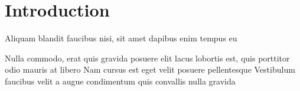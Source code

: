 \documentclass[
paper=landscape,
paper=160mm:90mm, %
fontsize=11pt, %
pagesize, %
parskip=half-, %
]{scrartcl} %
\theoremstyle{mythmstyle} %
\begin{document}
\clearpage




\section{Introduction}


\begin{outline}

\1 Aliquam blandit faucibus nisi, sit amet dapibus enim tempus eu

\2 Nulla commodo, erat quis gravida posuere
\1 elit lacus lobortis est, quis porttitor odio mauris at libero
\1 Nam cursus est eget velit posuere pellentesque
\1 Vestibulum faucibus velit a augue condimentum quis convallis nulla gravida

\end{outline}


\clearpage


\end{document}
